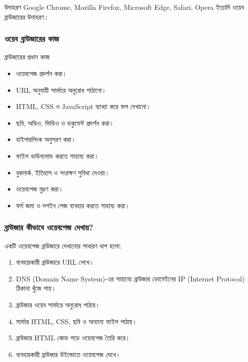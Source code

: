 \begin{examplebox}{উদাহরণ}
Google Chrome, Mozilla Firefox, Microsoft Edge, Safari, Opera ইত্যাদি ওয়েব ব্রাউজারের উদাহরণ।
\end{examplebox}

\subsubsection{ওয়েব ব্রাউজারের কাজ}

\begin{keypointbox}{ব্রাউজারের প্রধান কাজ}
\par\noindent
\begin{minipage}[t]{.48\linewidth}\vspace{0pt}
\begin{itemize}
\item ওয়েবপেজ প্রদর্শন করা।
\item URL অনুযায়ী সার্ভারে অনুরোধ পাঠানো।
\item HTML, CSS ও JavaScript ব্যাখ্যা করে ফল দেখানো।
\item ছবি, অডিও, ভিডিও ও ডকুমেন্ট প্রদর্শন করা।
\item হাইপারলিংক অনুসরণ করা।
\end{itemize}
\end{minipage}\hfill
\begin{minipage}[t]{.48\linewidth}\vspace{0pt}
\begin{itemize}
\item ফাইল ডাউনলোড করতে সাহায্য করা।
\item বুকমার্ক, ইতিহাস ও সংরক্ষণ সুবিধা দেওয়া।
\item ওয়েবপেজ মুদ্রণ করা।
\item ফর্ম জমা ও লগইন পেজ ব্যবহার করতে সাহায্য করা।
\end{itemize}
\end{minipage}\par

\end{keypointbox}

\subsubsection{ব্রাউজার কীভাবে ওয়েবপেজ দেখায়?}

একটি ওয়েবপেজ ব্রাউজারে দেখানোর সাধারণ ধাপ হলো:

\begin{enumerate}
\item ব্যবহারকারী ব্রাউজারে URL লেখে।
\item DNS (Domain Name System)-এর সাহায্যে ব্রাউজার ডোমেইনের IP (Internet Protocol) ঠিকানা খুঁজে পায়।
\item ব্রাউজার ওয়েব সার্ভারে অনুরোধ পাঠায়।
\item সার্ভার HTML, CSS, ছবি ও অন্যান্য ফাইল পাঠায়।
\item ব্রাউজার HTML কোড পড়ে ওয়েবপেজ তৈরি করে।
\item ব্যবহারকারী ব্রাউজার উইন্ডোতে ওয়েবপেজ দেখে।
\end{enumerate}

